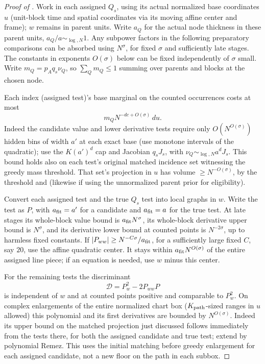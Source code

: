 \begin{proof}[Proof of ]
Work in each assigned \(Q_s\), using its actual normalized base coordinates \(u\) (unit-block time and spatial coordinates via its moving affine center and frame); \(w\) remains in parent units. Write \(a_Q\) for the actual node thickness in these parent units, \(a_Q/a\sim_{\log,N}1\). Any subpower factors in the following preparatory comparisons can be absorbed using \(N^\sigma\), for fixed \(\sigma\) and sufficiently late stages. The constants in exponents \(O(\sigma)\) below can be fixed independently of \(\sigma\) small. Write \(m_Q=p_A q_s\nu_Q\), so \(\sum_Q m_Q\le1\) summing over parents and blocks at the chosen node.

Each index (assigned test)'s base marginal on the counted occurrences costs at most
\begin{equation}
m_Q N^{-dc+O(\sigma)}\,du.                                                     \label{a03:candidate-marginal}
\end{equation}
Indeed the candidate value and lower derivative tests require only \(O(N^{O(\sigma)})\) hidden bins of width \(a'\) at each exact base (use monotone intervals of the quadratic); use the \(K(a')^d\) cap and Jacobian \(q_s J_s\), with \(\nu_Q\sim_{\log,N}a^d J_s\). This bound holds also on each test's original matched incidence set witnessing the greedy mass threshold. That set's projection in \(u\) has volume \(\ge N^{-O(\sigma)}\), by the threshold and  (likewise if using the unnormalized parent prior for eligibility).

Convert each assigned test and the true \(Q_s\) test into local
graphs in \(w\).  Write the test as \(P\), with
\(a_{\rm fit}=a'\) for a candidate and \(a_{\rm fit}=a\) for
the true test.  At late stages its whole-block value bound is
\(a_{\rm fit}N^\sigma\), its whole-block derivative upper bound
is \(N^\sigma\), and its derivative lower bound at counted points
is \(N^{-2\sigma}\), up to harmless fixed constants.
If \(|P_{ww}|\ge N^{-C\sigma}/a_{\rm fit}\), for a sufficiently
large fixed \(C\), say \(20\), use the affine quadratic center.
It stays within \(a_{\rm fit}N^{O(\sigma)}\) of the entire
assigned line piece; if an equation is needed, use \(w\) minus
this center.

For the remaining tests the discriminant
\begin{equation}
\mathcal D=P_w^2-2P_{ww}P
\end{equation}
is independent of \(w\) and at counted points positive and comparable to \(P_w^2\). On complex enlargements of the entire normalized chart box (\(K_{\rm path}\)-sized ranges in \(u\) allowed) this polynomial and its first derivatives are bounded by \(N^{O(\sigma)}\). Indeed its upper bound on the matched projection just discussed follows immediately from the tests there, for both the assigned candidate and true test; extend by polynomial Remez. This uses the initial matching before greedy enlargement for each assigned candidate, not a new floor on the path in each subbox.


\end{proof}
